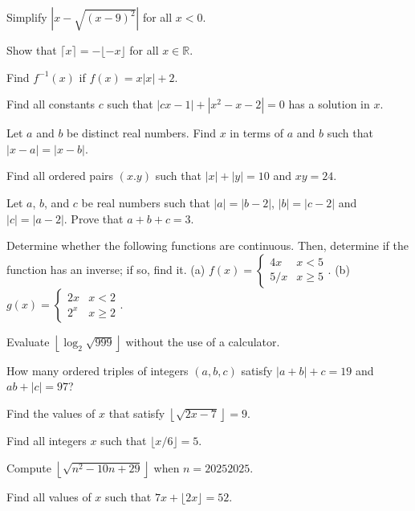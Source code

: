 \documentclass[lang=en,11pt]{elegantbook}
\begin{document}
\begin{reviewset}
\item Simplify $\left|x-\sqrt{(x-9)^2}\right|$ for all $x<0$. \vspace{3mm}
\item Show that $\lceil{x}\rceil=-\lfloor{-x}\rfloor$ for all $x\in\mathbb{R}$. \vspace{3mm}
\item Find $f^{-1}(x)$ if $f(x)=x|x|+2$. \vspace{3mm}
\item Find all constants $c$ such that $|cx-1|+|x^2-x-2|=0$ has a solution in $x$. \vspace{3mm}
\item Let $a$ and $b$ be distinct real numbers.  Find $x$ in terms of $a$ and $b$ such that $|x-a|=|x-b|$. \vspace{3mm}
\item Find all ordered pairs $(x.y)$ such that $|x|+|y|=10$ and $xy=24$. \vspace{3mm}
\item Let $a$, $b$, and $c$ be real numbers such that $|a|=|b-2|$, $|b|=|c-2|$ and $|c|=|a-2|$.  Prove that $a+b+c=3$.  \vspace{3mm}
\item Determine whether the following functions are continuous. Then, determine if the function has an inverse; if so, find it. \newline
(a) $f(x)=\begin{cases} 4x & x<5 \\ 5/x & x\geq 5 \end{cases}$. \hspace{30mm}
(b) $g(x)=\begin{cases} 2x & x<2 \\ 2^x & x\geq 2 \end{cases}$. \vspace{3mm}
\item Evaluate $\left\lfloor{\log_2\sqrt{999}}\right\rfloor$ without the use of a calculator.  \vspace{3mm}
\item How many ordered triples of integers $(a,b,c)$ satisfy $|a+b|+c=19$ and $ab+|c|=97$? \vspace{3mm}
\item Find the values of $x$ that satisfy $\left\lfloor{\sqrt{2x-7}}\right\rfloor=9$. \vspace{3mm}
\item Find all integers $x$ such that $\lfloor{x/6}\rfloor=5$. \vspace{3mm}
\item Compute $\left\lfloor{\sqrt{n^2-10n+29}}\right\rfloor$ when $n=20252025$. \vspace{3mm}
\item Find all values of $x$ such that $7x+\lfloor{2x}\rfloor=52$. \vspace{3mm}
\end{reviewset}
\end{document}
